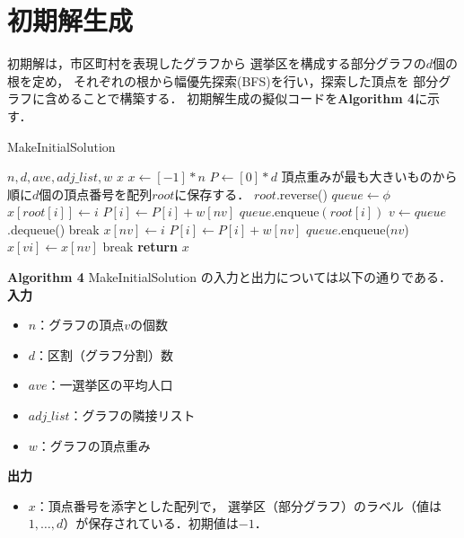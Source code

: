 \section{初期解生成} \label{section:4.2}

初期解は，市区町村を表現したグラフから
選挙区を構成する部分グラフの$d$個の根を定め，
それぞれの根から幅優先探索(BFS)を行い，探索した頂点を
部分グラフに含めることで構築する．
初期解生成の擬似コードを\textbf{Algorithm 4}に示す．

\begin{breakablealgorithm}
  \caption{MakeInitialSolution}
  \label{make_initial_solution}
  \begin{algorithmic}[1]
    \Require $n, d, ave, adj\_list, w$
    \Ensure $x$
    \State $x \gets [-1] * n$
    \State $P \gets [0] * d$
    \State 頂点重みが最も大きいものから順に$d$個の頂点番号を配列$root$に保存する．
    \State $root$.reverse()
      \State $queue \gets \phi $
      \State $x[root[i]] \gets i$
      \State $P[i] \gets P[i] + w[nv]$
      \State $queue$.enqueue$(root[i])$
        \State $v \gets queue$.dequeue()
            \State break
            \State $x[nv] \gets i$
            \State $P[i] \gets P[i] + w[nv]$
            \State $queue$.enqueue($nv$)
          \EndIf
        \EndFor
      \EndWhile
    \EndFor
              \State $x[vi] \gets x[nv]$
              \State break
            \EndIf
          \EndFor
        \EndIf
      \EndFor
    \EndWhile
    \State \textbf{return }$x$
  \end{algorithmic}
\end{breakablealgorithm}

\textbf{Algorithm 4} MakeInitialSolution の入力と出力については以下の通りである．\\
\textbf{入力}
\begin{itemize}
  \item $n$：グラフの頂点$v$の個数
  \item $d$：区割（グラフ分割）数
  \item $ave$：一選挙区の平均人口
  \item $adj\_list$：グラフの隣接リスト
  \item $w$：グラフの頂点重み
\end{itemize}
\textbf{出力}
\begin{itemize}
  \item $x$：頂点番号を添字とした配列で，
    選挙区（部分グラフ）のラベル（値は$1,\ldots,d$）が保存されている．初期値は$-1$．
\end{itemize}

